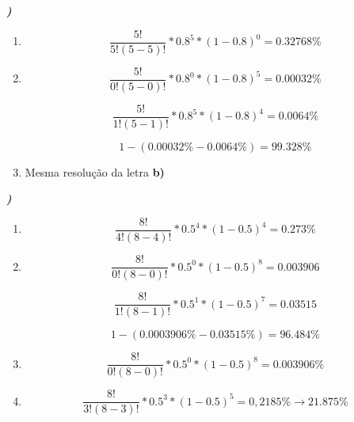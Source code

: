 \documentclass[12pt]{article}
\newcounter{instn}
\newcommand{\instnum}{\arabic{instn}}
\newcommand{\myline}[1]{
    \emph{\textbf{#1)}}
    \addtocounter{instn}{1}
}
\newenvironment{question}
 {
    \myline{\instnum} 
    }
    {
 }
\begin{document}
    \begin{question}

        \begin{enumerate}[label={\textbf{\alph*)}}]
            \item        
            \begin{equation}
                \frac{5!}{5!(5-5)!} * 0.8^{5}*(1-0.8)^{0} = 0.32768\%
            \end{equation}
            \item 
            \[
                \frac{5!}{0!(5-0)!} * 0.8^{0}*(1-0.8)^{5} = 0.00032\%
            \]

            \[
                \frac{5!}{1!(5-1)!} * 0.8^{5}*(1-0.8)^{4} = 0.0064\%
            \] 

            \begin{equation}
                1-(0.00032\% - 0.0064\%) = 99.328\%
            \end{equation}

            \item Mesma resolução da letra \textbf{b)}
        \end{enumerate}
        
    \end{question}


    \begin{question}
        
        \begin{enumerate}[label={\textbf{\alph*)}}]
            \item        
            \begin{equation}
                \frac{8!}{4!(8-4)!} * 0.5^{4}*(1-0.5)^{4} = 0.273\%
            \end{equation}
            \item 
            \[
                \frac{8!}{0!(8-0)!} * 0.5^{0}*(1-0.5)^{8} = 0.003906
            \]

            \[
                \frac{8!}{1!(8-1)!} * 0.5^{1}*(1-0.5)^{7} = 0.03515
            \]

            \begin{equation}
                1-(0.0003906\% - 0.03515\%) = 96.484\%
            \end{equation}

            \item  
            \begin{equation}
                \frac{8!}{0!(8-0)!} * 0.5^{0}*(1-0.5)^{8} = 0.003906\%
            \end{equation}

            \item  
            \begin{equation}
                \frac{8!}{3!(8-3)!} * 0.5^{3}*(1-0.5)^{5} = 0,2185\% \rightarrow 21.875\%
            \end{equation}
        \end{enumerate}
    \end{question}
\end{document}
